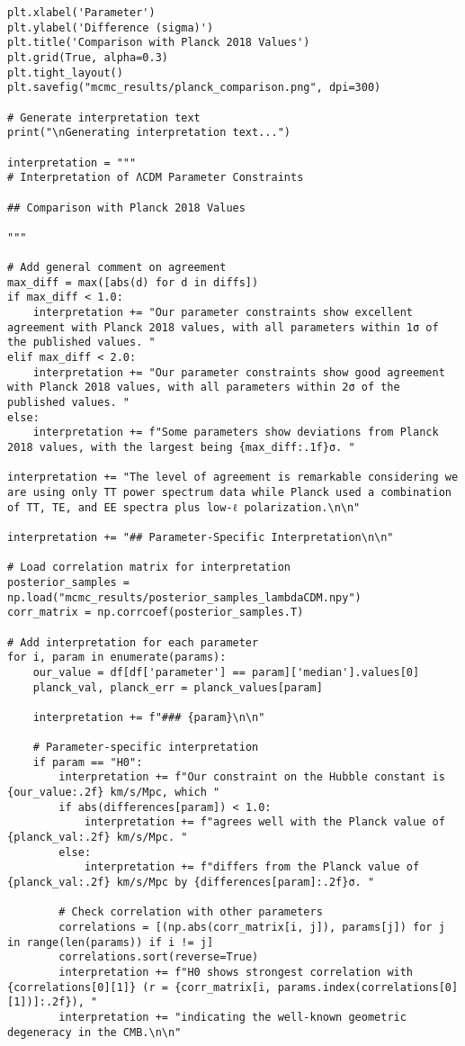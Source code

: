 \documentclass[11pt]{article}
\begin{document}
\begin{enumerate}
\begin{lstlisting}[basicstyle=\small\ttfamily]
plt.xlabel('Parameter')
plt.ylabel('Difference (sigma)')
plt.title('Comparison with Planck 2018 Values')
plt.grid(True, alpha=0.3)
plt.tight_layout()
plt.savefig("mcmc_results/planck_comparison.png", dpi=300)

# Generate interpretation text
print("\nGenerating interpretation text...")

interpretation = """
# Interpretation of ΛCDM Parameter Constraints

## Comparison with Planck 2018 Values

"""

# Add general comment on agreement
max_diff = max([abs(d) for d in diffs])
if max_diff < 1.0:
    interpretation += "Our parameter constraints show excellent agreement with Planck 2018 values, with all parameters within 1σ of the published values. "
elif max_diff < 2.0:
    interpretation += "Our parameter constraints show good agreement with Planck 2018 values, with all parameters within 2σ of the published values. "
else:
    interpretation += f"Some parameters show deviations from Planck 2018 values, with the largest being {max_diff:.1f}σ. "

interpretation += "The level of agreement is remarkable considering we are using only TT power spectrum data while Planck used a combination of TT, TE, and EE spectra plus low-ℓ polarization.\n\n"

interpretation += "## Parameter-Specific Interpretation\n\n"

# Load correlation matrix for interpretation
posterior_samples = np.load("mcmc_results/posterior_samples_lambdaCDM.npy")
corr_matrix = np.corrcoef(posterior_samples.T)

# Add interpretation for each parameter
for i, param in enumerate(params):
    our_value = df[df['parameter'] == param]['median'].values[0]
    planck_val, planck_err = planck_values[param]
    
    interpretation += f"### {param}\n\n"
    
    # Parameter-specific interpretation
    if param == "H0":
        interpretation += f"Our constraint on the Hubble constant is {our_value:.2f} km/s/Mpc, which "
        if abs(differences[param]) < 1.0:
            interpretation += f"agrees well with the Planck value of {planck_val:.2f} km/s/Mpc. "
        else:
            interpretation += f"differs from the Planck value of {planck_val:.2f} km/s/Mpc by {differences[param]:.2f}σ. "
        
        # Check correlation with other parameters
        correlations = [(np.abs(corr_matrix[i, j]), params[j]) for j in range(len(params)) if i != j]
        correlations.sort(reverse=True)
        interpretation += f"H0 shows strongest correlation with {correlations[0][1]} (r = {corr_matrix[i, params.index(correlations[0][1])]:.2f}), "
        interpretation += "indicating the well-known geometric degeneracy in the CMB.\n\n"
        

\end{lstlisting}
\end{enumerate}
\end{document}
